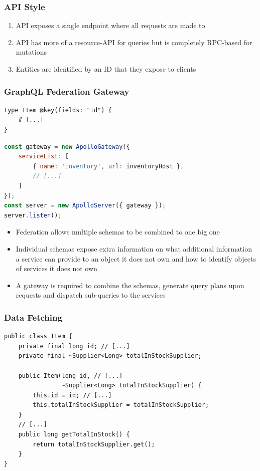 \subsubsection{\acs{API} Style}

\begin{enumerate}
    \item API exposes a single endpoint where all requests are made to
    \item API has more of a resource-API for queries but is completely RPC-based for mutations
    \item Entities are identified by an ID that they expose to clients
\end{enumerate}

\subsubsection{GraphQL Federation Gateway}

\begin{lstlisting}[caption={Schema Definition to Enable Federation}, language=graphqls]
type Item @key(fields: "id") {
    # [...]
}
\end{lstlisting}

\begin{lstlisting}[caption={Implementation of the GraphQL Gateway}, language=javascript]
const gateway = new ApolloGateway({
    serviceList: [
        { name: 'inventory', url: inventoryHost },
        // [...]
    ]
});
const server = new ApolloServer({ gateway });
server.listen();
\end{lstlisting}

\begin{itemize}
    \item Federation allows multiple schemas to be combined to one big one
    \item Individual schemas expose extra information on what additional information a service can provide to an object it does not own and how to identify objects of services it does not own
    \item A gateway is required to combine the schemas, generate query plans upon requests and dispatch sub-queries to the services
\end{itemize}

\subsubsection{Data Fetching}

\begin{lstlisting}[caption={Data Fetching in \acs{API} Models}, style=java-ext]
public class Item {
    private final long id; // [...]
    private final ~Supplier<Long> totalInStockSupplier;

    public Item(long id, // [...]
                ~Supplier<Long> totalInStockSupplier) {
        this.id = id; // [...]
        this.totalInStockSupplier = totalInStockSupplier;
    }
    // [...]
    public long getTotalInStock() {
        return totalInStockSupplier.get();
    }
}
\end{lstlisting}

